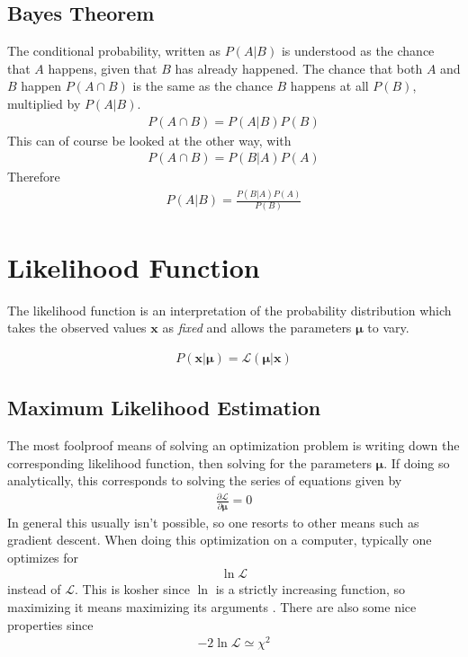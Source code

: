 

\subsection{Bayes Theorem}
The conditional probability, written as $P(A|B)$ is understood as the chance that $A$ happens, given that $B$ has already happened. The chance that both $A$ and $B$ happen $P(A \cap B)$ is the same as the chance $B$ happens at all $P(B)$, multiplied by $P(A|B)$.
\begin{align}
P(A\cap B) = P(A|B)P(B)
\end{align}
This can of course be looked at the other way, with
\begin{align}
P(A\cap B) = P(B|A)P(A)
\end{align}
Therefore
\begin{align}
P(A|B) = \frac{P(B|A)P(A)}{P(B)}
\end{align}

\section{Likelihood Function}

The likelihood function is an interpretation of the probability distribution which takes the observed values $\textbf{x}$ as \textit{fixed} and allows the parameters $\boldsymbol{\mu}$ to vary.

\begin{align}
	P(\textbf{x}|\boldsymbol{\mu}) = \mathcal{L}(\boldsymbol{\mu}|\textbf{x})
\end{align}

\subsection{Maximum Likelihood Estimation}
The most foolproof means of solving an optimization problem is writing down the corresponding likelihood function, then solving for the parameters $\boldsymbol{\mu}$. If doing so analytically, this corresponds to solving the series of equations given by
\begin{align}
\frac{\partial \mathcal{L}}{\partial \boldsymbol{\mu}} = 0
\end{align}
In general this usually isn't possible, so one resorts to other means such as gradient descent. When doing this optimization on a computer, typically one optimizes for
\begin{align}
	\ln\mathcal{L}
\end{align}
instead of $\mathcal{L}$. This is kosher since $\ln$ is a strictly increasing function, so maximizing it means maximizing its arguments \cite{burkov}. There are also some nice properties since 
\begin{align}
-2\ln\mathcal{L} \simeq \chi^2
\end{align}

